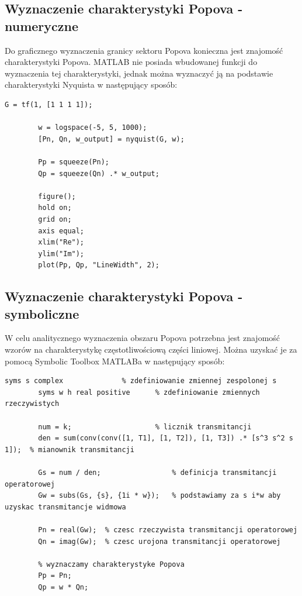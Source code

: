 \documentclass{article}
\begin{document}
    \subsection{Wyznaczenie charakterystyki Popova - numeryczne}
    Do graficznego wyznaczenia granicy sektoru Popova konieczna jest znajomość charakterystyki Popova.
    MATLAB nie posiada wbudowanej funkcji do wyznaczenia tej charakterystyki, jednak można wyznaczyć ją na podstawie charakterystyki Nyquista w następujący sposób:
    \begin{lstlisting}[style=Matlab-editor]
        G = tf(1, [1 1 1 1]);
        
        w = logspace(-5, 5, 1000);
        [Pn, Qn, w_output] = nyquist(G, w);

        Pp = squeeze(Pn);
        Qp = squeeze(Qn) .* w_output;

        figure();
        hold on;
        grid on;
        axis equal;
        xlim("Re");
        ylim("Im");
        plot(Pp, Qp, "LineWidth", 2);
    \end{lstlisting}

    \subsection{Wyznaczenie charakterystyki Popova - symboliczne}
    W celu analitycznego wyznaczenia obszaru Popova potrzebna jest znajomość wzorów na charakterystykę częstotliwościową części liniowej.
    Można uzyskać je za pomocą Symbolic Toolbox MATLABa w następujący sposób:
    \begin{lstlisting}[style=Matlab-editor]
        syms s complex              % zdefiniowanie zmiennej zespolonej s
        syms w h real positive      % zdefiniowanie zmiennych rzeczywistych
        
        num = k;                    % licznik transmitancji
        den = sum(conv(conv([1, T1], [1, T2]), [1, T3]) .* [s^3 s^2 s 1]);  % mianownik transmitancji
        
        Gs = num / den;                 % definicja transmitancji operatorowej
        Gw = subs(Gs, {s}, {1i * w});   % podstawiamy za s i*w aby uzyskac transmitancje widmowa
        
        Pn = real(Gw);  % czesc rzeczywista transmitancji operatorowej
        Qn = imag(Gw);  % czesc urojona transmitancji operatorowej

        % wyznaczamy charakterystyke Popova
        Pp = Pn;
        Qp = w * Qn;
    \end{lstlisting}
\end{document}
